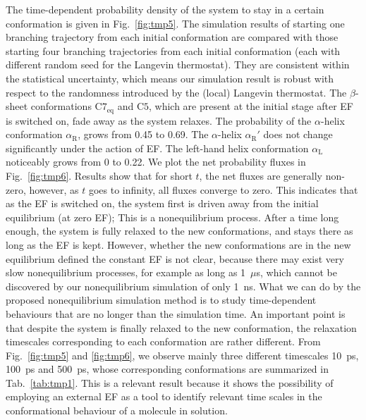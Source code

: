 \documentclass[a4paper,preprint,unsortedaddress,onecolumn]{revtex4-1}
\newcommand{\recheck}[1]{{\color{red} #1}}
\newcommand{\confaa}[0]{{\alpha_{\textrm{R}}}}
\newcommand{\confab}[0]{{\alpha_{\textrm{R}}'}}
\newcommand{\confba}[0]{{\textrm{C}7_{\textrm{eq}}}}
\newcommand{\confbb}[0]{{\textrm{C}5}}
\newcommand{\confc}[0]{{\alpha_{\textrm{L}}}}
\begin{document}
The time-dependent probability density of the system to stay in a certain
conformation is given in
Fig.~\ref{fig:tmp5}.
\recheck{The simulation results of starting one branching trajectory
  from each initial conformation are compared with those starting
  four branching trajectories from each initial conformation (each with
  different random seed for the Langevin thermostat).
  They are consistent within the statistical uncertainty, which
  means our simulation result is robust with respect to the randomness
  introduced by the (local) Langevin thermostat.
}
The $\beta$-sheet conformations $\confba$ and $\confbb$,
which are present at the initial stage after EF is switched on,
\recheck{fade away as the system relaxes}. The
probability of the $\alpha$-helix conformation $\confaa$, grows from 0.45 to 0.69.
The $\alpha$-helix $\confab$  does not change significantly  under the action of EF.
The left-hand helix conformation $\confc$ noticeably grows from 0 to 0.22.
We plot the net probability fluxes in Fig.~\ref{fig:tmp6}.
Results show that for short $t$, the net fluxes are generally non-zero,
however, 
as $t$ goes to infinity,
all fluxes converge to zero. This indicates
that as the EF is switched on, the system first is driven away from the initial
equilibrium (at zero EF);  This is a nonequilibrium process.
\recheck{After a time long enough, the system
is fully relaxed to the new conformations,
and stays there as long as the EF is kept. However, whether the new conformations
are in the new equilibrium defined the constant EF is not clear, because
there may exist very slow nonequilibrium processes, for example as long as 1~$\mu$s,
which cannot be discovered by our nonequilibrium simulation of only 1~ns.
What we can do by the proposed nonequilibrium simulation
method is to study time-dependent behaviours that are no longer than
the simulation time. 
}
An important point is that despite the system is finally relaxed to the new conformation,
the relaxation timescales corresponding to each conformation are rather different. 
From Fig.~\ref{fig:tmp5} and \ref{fig:tmp6}, we observe mainly
three different timescales 10~ps, 100~ps and 500~ps,
whose corresponding conformations are summarized in Tab.~\ref{tab:tmp1}.
This is a relevant result because it shows the possibility of employing an external EF as a tool to identify relevant time scales in the conformational behaviour of a molecule in solution.
\end{document}
